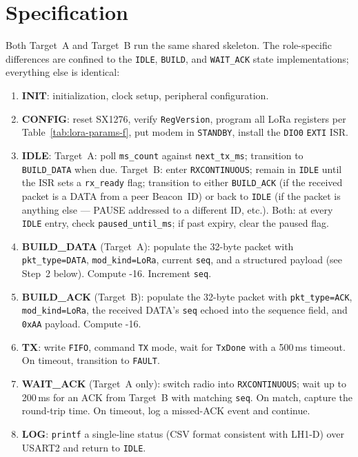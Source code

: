 \documentclass[11pt,letterpaper]{article}
\begin{document}
\section{\FSM{} Specification}
Both Target~A and Target~B run the same shared \FSM{} skeleton. The role-specific differences are confined to the \texttt{IDLE}, \texttt{BUILD}, and \texttt{WAIT\_ACK} state implementations; everything else is identical:
\begin{enumerate}[leftmargin=2em]
	\item \textbf{INIT}: \HAL{} initialization, clock setup, peripheral configuration.
	\item \textbf{CONFIG}: reset SX1276, verify \texttt{RegVersion}, program all LoRa registers per Table~\ref{tab:lora-params-f}, put modem in \texttt{STANDBY}, install the \texttt{DIO0} \texttt{EXTI} ISR.
	\item \textbf{IDLE}: Target~A: poll \texttt{ms\_count} against \texttt{next\_tx\_ms}; transition to \texttt{BUILD\_DATA} when due. Target~B: enter \texttt{RXCONTINUOUS}; remain in \texttt{IDLE} until the ISR sets a \texttt{rx\_ready} flag; transition to either \texttt{BUILD\_ACK} (if the received packet is a DATA from a peer Beacon~ID) or back to \texttt{IDLE} (if the packet is anything else --- PAUSE addressed to a different ID, etc.). Both: at every \texttt{IDLE} entry, check \texttt{paused\_until\_ms}; if past expiry, clear the paused flag.
	\item \textbf{BUILD\_DATA} (Target~A): populate the 32-byte packet with \texttt{pkt\_type=DATA}, \texttt{mod\_kind=LoRa}, current \texttt{seq}, and a structured payload (see Step~2 below). Compute \CRC{}-16. Increment \texttt{seq}.
	\item \textbf{BUILD\_ACK} (Target~B): populate the 32-byte packet with \texttt{pkt\_type=ACK}, \texttt{mod\_kind=LoRa}, the received DATA's \texttt{seq} echoed into the sequence field, and \texttt{0xAA} payload. Compute \CRC{}-16.
	\item \textbf{TX}: write \texttt{FIFO}, command \texttt{TX} mode, wait for \texttt{TxDone} with a 500\,ms timeout. On timeout, transition to \texttt{FAULT}.
	\item \textbf{WAIT\_ACK} (Target~A only): switch radio into \texttt{RXCONTINUOUS}; wait up to 200\,ms for an ACK from Target~B with matching \texttt{seq}. On match, capture the round-trip time. On timeout, log a missed-ACK event and continue.
	\item \textbf{LOG}: \texttt{printf} a single-line status (CSV format consistent with LH1-D) over USART2 and return to \texttt{IDLE}.

\end{enumerate}
\end{document}
